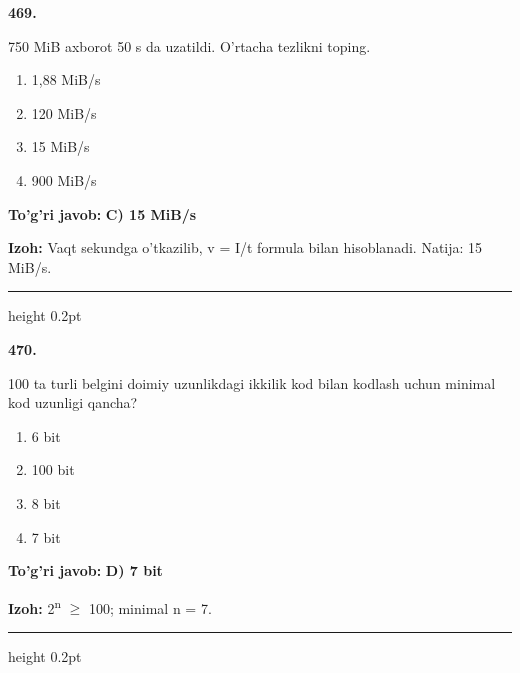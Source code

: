 \documentclass[10pt,a4paper,oneside]{article}
\begin{document}
\noindent\textbf{\color{ink}469.}
\par
750 MiB axborot 50 s da uzatildi. O'rtacha tezlikni toping.
\begin{enumerate}[label=\Alph*),leftmargin=9mm]
\item 1,88 MiB/s
\item 120 MiB/s
\item 15 MiB/s
\item 900 MiB/s
\end{enumerate}
\begin{tcolorbox}[enhanced,breakable,colback=teal!4,colframe=teal!50!black,boxrule=0.5pt,arc=1.1mm,left=3mm,right=3mm,top=1.7mm,bottom=1.7mm,before skip=2mm,after skip=2mm]
\textbf{\color{teal}To'g'ri javob:} \textbf{C) 15 MiB/s}
\par\smallskip
\textbf{Izoh:} Vaqt sekundga o'tkazilib, v = I/t formula bilan hisoblanadi. Natija: 15 MiB/s.
\end{tcolorbox}
\vspace{2mm}\hrule height 0.2pt \vspace{3mm}

\noindent\textbf{\color{ink}470.}
\par
100 ta turli belgini doimiy uzunlikdagi ikkilik kod bilan kodlash uchun minimal kod uzunligi qancha?
\begin{enumerate}[label=\Alph*),leftmargin=9mm]
\item 6 bit
\item 100 bit
\item 8 bit
\item 7 bit
\end{enumerate}
\begin{tcolorbox}[enhanced,breakable,colback=teal!4,colframe=teal!50!black,boxrule=0.5pt,arc=1.1mm,left=3mm,right=3mm,top=1.7mm,bottom=1.7mm,before skip=2mm,after skip=2mm]
\textbf{\color{teal}To'g'ri javob:} \textbf{D) 7 bit}
\par\smallskip
\textbf{Izoh:} 2\textsuperscript{n} \ensuremath{\geq} 100; minimal n = 7.
\end{tcolorbox}
\vspace{2mm}\hrule height 0.2pt \vspace{3mm}
\end{document}
